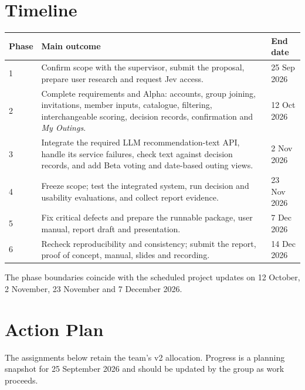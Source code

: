 \documentclass[12pt,a4paper]{article}
\begin{document}
\section*{Timeline}
\begin{longtable}{@{}p{}p{}p{}@{}}
  \toprule
  \textbf{Phase} & \textbf{Main outcome} & \textbf{End date} \\
  \midrule
  \endhead
  1 & Confirm scope with the supervisor, submit the proposal, prepare user research and request Jev access. & 25 Sep 2026 \\
  \midrule
  2 & Complete requirements and Alpha: accounts, group joining, invitations, member inputs, catalogue, filtering, interchangeable scoring, decision records, confirmation and \emph{My Outings}. & 12 Oct 2026 \\
  \midrule
  3 & Integrate the required LLM recommendation-text API, handle its service failures, check text against decision records, and add Beta voting and date-based outing views. & 2 Nov 2026 \\
  \midrule
  4 & Freeze scope; test the integrated system, run decision and usability evaluations, and collect report evidence. & 23 Nov 2026 \\
  \midrule
  5 & Fix critical defects and prepare the runnable package, user manual, report draft and presentation. & 7 Dec 2026 \\
  \midrule
  6 & Recheck reproducibility and consistency; submit the report, proof of concept, manual, slides and recording. & 14 Dec 2026 \\
  \bottomrule
\end{longtable}
The phase boundaries coincide with the scheduled project updates on 12 October, 2 November, 23 November and 7 December 2026.

\section*{Action Plan}
The assignments below retain the team's v2 allocation. Progress is a planning snapshot for 25 September 2026 and should be updated by the group as work proceeds.
\end{document}
